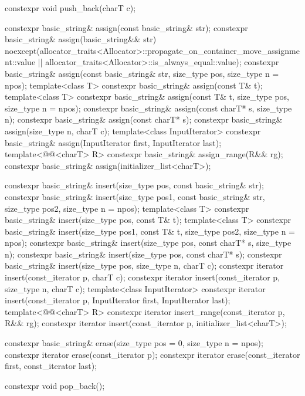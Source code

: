 \begin{codeblock}
{{    constexpr void push_back(charT c);

    constexpr basic_string& assign(const basic_string& str);
    constexpr basic_string& assign(basic_string&& str)
      noexcept(allocator_traits<Allocator>::propagate_on_container_move_assignment::value ||
               allocator_traits<Allocator>::is_always_equal::value);
    constexpr basic_string& assign(const basic_string& str, size_type pos, size_type n = npos);
    template<class T>
      constexpr basic_string& assign(const T& t);
    template<class T>
      constexpr basic_string& assign(const T& t, size_type pos, size_type n = npos);
    constexpr basic_string& assign(const charT* s, size_type n);
    constexpr basic_string& assign(const charT* s);
    constexpr basic_string& assign(size_type n, charT c);
    template<class InputIterator>
      constexpr basic_string& assign(InputIterator first, InputIterator last);
    template<@@<charT> R>
      constexpr basic_string& assign_range(R&& rg);
    constexpr basic_string& assign(initializer_list<charT>);

    constexpr basic_string& insert(size_type pos, const basic_string& str);
    constexpr basic_string& insert(size_type pos1, const basic_string& str,
                                   size_type pos2, size_type n = npos);
    template<class T>
      constexpr basic_string& insert(size_type pos, const T& t);
    template<class T>
      constexpr basic_string& insert(size_type pos1, const T& t,
                                     size_type pos2, size_type n = npos);
    constexpr basic_string& insert(size_type pos, const charT* s, size_type n);
    constexpr basic_string& insert(size_type pos, const charT* s);
    constexpr basic_string& insert(size_type pos, size_type n, charT c);
    constexpr iterator insert(const_iterator p, charT c);
    constexpr iterator insert(const_iterator p, size_type n, charT c);
    template<class InputIterator>
      constexpr iterator insert(const_iterator p, InputIterator first, InputIterator last);
    template<@@<charT> R>
      constexpr iterator insert_range(const_iterator p, R&& rg);
    constexpr iterator insert(const_iterator p, initializer_list<charT>);

    constexpr basic_string& erase(size_type pos = 0, size_type n = npos);
    constexpr iterator erase(const_iterator p);
    constexpr iterator erase(const_iterator first, const_iterator last);

    constexpr void pop_back();

}}
\end{codeblock}
